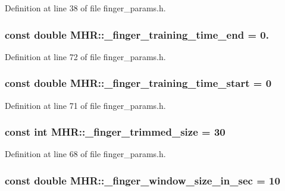 Definition at line 38 of file finger\+\_\+params.\+h.

\hypertarget{namespace_m_h_r_a69b9408e97af3e5261c4ede559d9f7d6}{
\subsubsection[{\+\_\+finger\+\_\+training\+\_\+time\+\_\+end}]{\setlength{\rightskip}{0pt plus 5cm}const double M\+H\+R\+::\+\_\+finger\+\_\+training\+\_\+time\+\_\+end = 0.}}\label{namespace_m_h_r_a69b9408e97af3e5261c4ede559d9f7d6}


Definition at line 72 of file finger\+\_\+params.\+h.

\hypertarget{namespace_m_h_r_afcd48923eb1d7b2aff98acc4cf2a9d24}{
\subsubsection[{\+\_\+finger\+\_\+training\+\_\+time\+\_\+start}]{\setlength{\rightskip}{0pt plus 5cm}const double M\+H\+R\+::\+\_\+finger\+\_\+training\+\_\+time\+\_\+start = 0}}\label{namespace_m_h_r_afcd48923eb1d7b2aff98acc4cf2a9d24}


Definition at line 71 of file finger\+\_\+params.\+h.

\hypertarget{namespace_m_h_r_a8a6e23a5b4183588a231061fe7d43524}{
\subsubsection[{\+\_\+finger\+\_\+trimmed\+\_\+size}]{\setlength{\rightskip}{0pt plus 5cm}const int M\+H\+R\+::\+\_\+finger\+\_\+trimmed\+\_\+size = 30}}\label{namespace_m_h_r_a8a6e23a5b4183588a231061fe7d43524}


Definition at line 68 of file finger\+\_\+params.\+h.

\hypertarget{namespace_m_h_r_a04093f94b342ed569322ef2c3a5bcce2}{
\subsubsection[{\+\_\+finger\+\_\+window\+\_\+size\+\_\+in\+\_\+sec}]{\setlength{\rightskip}{0pt plus 5cm}const double M\+H\+R\+::\+\_\+finger\+\_\+window\+\_\+size\+\_\+in\+\_\+sec = 10}}\label{namespace_m_h_r_a04093f94b342ed569322ef2c3a5bcce2}


